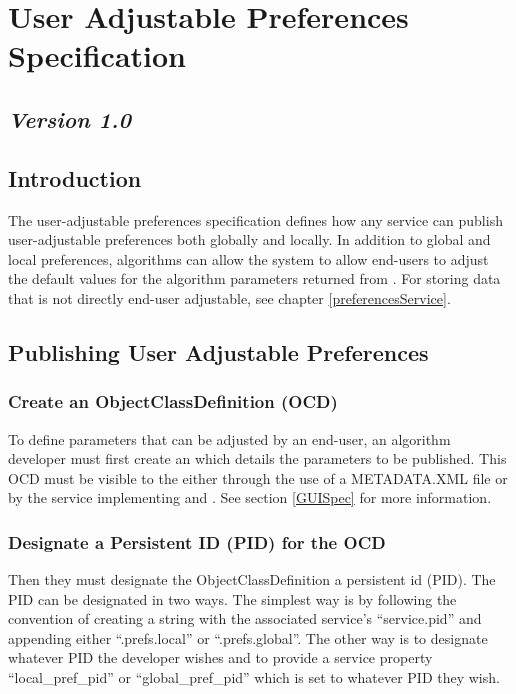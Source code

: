 \section{User Adjustable Preferences Specification}
\label{userPrefsSpec}
\subsection*{\textit{Version 1.0}}
\subsection{Introduction}

The user-adjustable preferences specification defines how any service can publish
user-adjustable preferences both globally and locally. In addition to global and
local preferences, algorithms can allow the system to allow end-users to adjust
the default values for the algorithm parameters returned from
. For storing data that is not directly
end-user adjustable, see chapter \ref{preferencesService}.

\subsection{Publishing User Adjustable Preferences}

\subsubsection*{Create an ObjectClassDefinition (OCD)} To define parameters that
can be adjusted by an end-user, an algorithm developer must first create an
 which details the parameters to be published. This
OCD must be visible to the  either through the use of a
METADATA.XML file or by the service implementing  and
. See section \ref{GUISpec} for more information.

\subsubsection*{Designate a Persistent ID (PID) for the OCD} Then they must
designate the ObjectClassDefinition a persistent id (PID). The PID can be
designated in two ways. The simplest way is by following the convention of
creating a string with the associated service's ``service.pid'' and appending
either ``.prefs.local'' or ``.prefs.global''. The other way is to designate
whatever PID the developer wishes and to provide a service property
``local\_pref\_pid'' or ``global\_pref\_pid'' which is set to whatever PID they wish.

